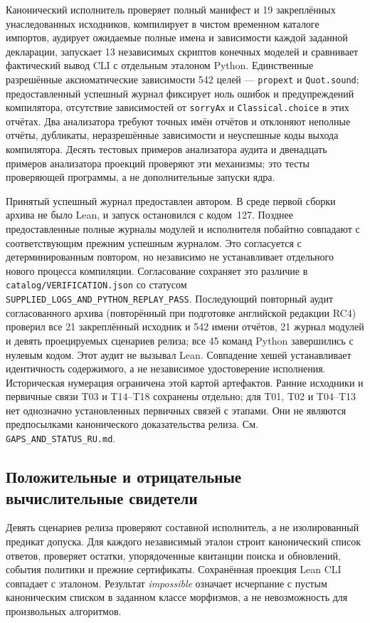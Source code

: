 \documentclass[10pt,a4paper]{article}
\newcommand{\rc}[1]{\allowbreak\texttt{#1}\allowbreak}
\begin{document}
Канонический исполнитель проверяет полный манифест и 19 закреплённых унаследованных исходников, компилирует в чистом временном каталоге импортов, аудирует ожидаемые полные имена и зависимости каждой заданной декларации, запускает 13 независимых скриптов конечных моделей и сравнивает фактический вывод CLI с отдельным эталоном Python. Единственные разрешённые аксиоматические зависимости 542 целей --- \rc{propext} и \rc{Quot.sound}; предоставленный успешный журнал фиксирует ноль ошибок и предупреждений компилятора, отсутствие зависимостей от \rc{sorryAx} и \rc{Classical.choice} в этих отчётах. Два анализатора требуют точных имён отчётов и отклоняют неполные отчёты, дубликаты, неразрешённые зависимости и неуспешные коды выхода компилятора. Десять тестовых примеров анализатора аудита и двенадцать примеров анализатора проекций проверяют эти механизмы; это тесты проверяющей программы, а не дополнительные запуски ядра.

Принятый успешный журнал предоставлен автором. В среде первой сборки архива не было Lean, и запуск остановился с кодом~127. Позднее предоставленные полные журналы модулей и исполнителя побайтно совпадают с соответствующим прежним успешным журналом. Это согласуется с детерминированным повтором, но независимо не устанавливает отдельного нового процесса компиляции. Согласование сохраняет это различие в \rc{catalog/VERIFICATION.json} со статусом \rc{SUPPLIED\_LOGS\_AND\_PYTHON\_REPLAY\_PASS}. Последующий повторный аудит согласованного архива (повторённый при подготовке английской редакции RC4) проверил все 21 закреплённый исходник и 542 имени отчётов, 21 журнал модулей и девять проецируемых сценариев релиза; все 45 команд Python завершились с нулевым кодом. Этот аудит не вызывал Lean. Совпадение хешей устанавливает идентичность содержимого, а не независимое удостоверение исполнения. Историческая нумерация ограничена этой картой артефактов. Ранние исходники и первичные связи T03 и T14--T18 сохранены отдельно; для T01, T02 и T04--T13 нет однозначно установленных первичных связей с этапами. Они не являются предпосылками канонического доказательства релиза. См. \rc{GAPS\_AND\_STATUS\_RU.md}.

\clearpage
\subsection{Положительные и отрицательные вычислительные свидетели}
Девять сценариев релиза проверяют составной исполнитель, а не изолированный предикат допуска. Для каждого независимый эталон строит канонический список ответов, проверяет остатки, упорядоченные квитанции поиска и обновлений, события политики и прежние сертификаты. Сохранённая проекция Lean CLI совпадает с эталоном. Результат \emph{impossible} означает исчерпание с пустым каноническим списком в заданном классе морфизмов, а не невозможность для произвольных алгоритмов.
\end{document}
